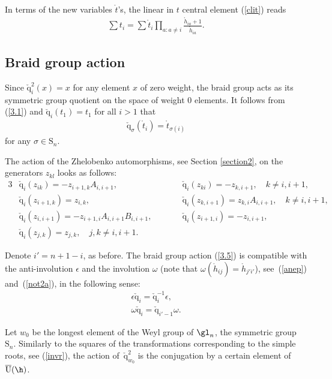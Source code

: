 \documentclass[11pt]{article}
\def\nplus{\mathfrak{n}}\def\nn{\nonumber}\def\nin{\noindent}
\def\q{\check{\mathrm q}}\def\Q{\mathrm{Q}}\def\r#1{(\ref{#1})}\let\rf=\r
\def\s{z}\def\S{\mathrm {S}}\def\si{\sigma}\def\Sp{\S^{\nplus}}\def\sy{\acute{\sigma}}\def\th{\mathring{h}}
\def\tphi{A}\def\tpsi{A'}\def\tphiplus{B}\def\tpsiminus{B'}\def\ttphi{B}\def\ttpsi{B'}\def\ts{\hskip1pt}\def\tts{\hskip.5pt}
\def\tt{\mathring{t}}\def\U{\mathrm{U}}\def\Uh{\overline{\U}(\h)}\def\UU{\overline{\U}}\def\UUh{{\cal{D}}(\h)}
\numberwithin{equation}{section}
\begin{document}
In terms of the new variables $\tt$'s, the linear in $t$ central element (\ref{clit}) reads
\begin{gather*}
\sum t_i=\sum\tt_i\prod_{a:a\neq i}\frac{\th_{ia}+1}{\th_{ia}} .
\end{gather*}

\subsection{Braid group action}
\label{brgac}

Since
$\q_{i}^2(x)=x$ for any element $x$ of zero weight, the braid group acts as its symmetric group quotient on the space of weight 0 elements.
It follows from \rf{3.1} and $\q_{i}(t_1)=t_1$ for all $i>1$ that
\begin{gather}\label{3.2}
\q_{\sigma}(\tt_i)=\tt_{\sigma(i)}
\end{gather}
for any $\sigma\in \S_n$.


The action of the Zhelobenko automorphisms, see Section \ref{section2},  on the generators $\s_{kl}$  looks as follows:
\begin{alignat}{3}
& \q_i(\s_{ik})=-\s_{i+1,k}\tphi_{i,i+1} , \qquad  &&
\q_i(\s_{ki})=-\s_{k,i+1} ,\quad k\not=i,i+1 ,& \nonumber\\
&\q_i(\s_{i+1,k})=\s_{i,k} ,\qquad && \q_i(\s_{k,i+1})=\s_{k,i}\tphi_{i,i+1} ,\quad k\not=i,i+1 ,& \label{3.5}\\
& \q_i(\s_{i,i+1})=-\s_{i+1,i}\tphi_{i,i+1}\ttphi_{i,i+1} ,\qquad && \q_i(\s_{i+1,i})=-\s_{i,i+1} , & \nonumber\\
&\q_{i}(\s_{j,k})=\s_{j,k} ,\quad j,k\neq i,i+1 .\qquad &&&\nonumber
\end{alignat}

Denote $i'=n+1-i$, as before. The braid group action \rf{3.5} is compatible with the anti-involution $\epsilon$
and the involution $\omega$ (note that $\omega (\th_{ij})=\th_{j'i'}$),  see~\rf{anep} and~\rf{not2a}, in the following sense:
\begin{gather}
\epsilon  \q_i =\q_i^{-1}\epsilon  ,\\
 \omega  \q_i =\q_{i'-1}\omega .\label{qeps}
\end{gather}


Let $w_0$ be the longest element of the Weyl group of $\gl_n$, the symmetric group $\S_n$. Similarly to the squares of
the transformations corresponding to the simple roots, see \rf{invr}, the action of~$\q_{w_0}^2$ is the conjugation by a
certain element of $\Uh$.
\end{document}
